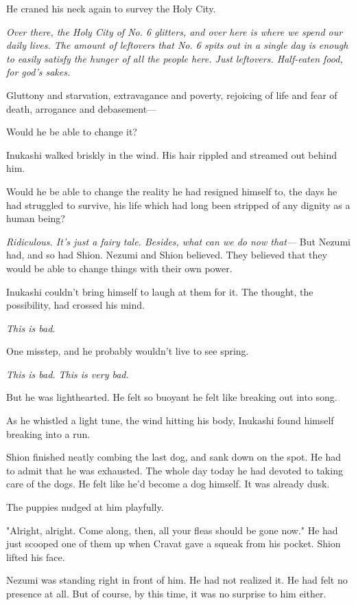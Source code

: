 He craned his neck again to survey the Holy City.

\emph{Over there, the Holy City of No. 6 glitters, and over here is where we
spend our daily lives. The amount of leftovers that No. 6 spits out in a
single day is enough to easily satisfy the hunger of all the people
here. Just leftovers. Half-eaten food, for god's sakes.}

Gluttony and starvation, extravagance and poverty, rejoicing of life and
fear of death, arrogance and debasement---

Would he be able to change it?

Inukashi walked briskly in the wind. His hair rippled and streamed out
behind him.

Would he be able to change the reality he had resigned himself to, the
days he had struggled to survive, his life which had long been stripped
of any dignity as a human being?

\emph{Ridiculous. It's just a fairy tale. Besides, what can we do now that---}
But Nezumi had, and so had Shion. Nezumi and Shion believed. They
believed that they would be able to change things with their own power.

Inukashi couldn't bring himself to laugh at them for it. The thought,
the possibility, had crossed his mind.

\emph{This is bad.}

One misstep, and he probably wouldn't live to see spring.

\emph{This is bad. This is very bad.}

But he was lighthearted. He felt so buoyant he felt like breaking out
into song.

As he whistled a light tune, the wind hitting his body, Inukashi found
himself breaking into a run.

\myspace

Shion finished neatly combing the last dog, and sank down on the spot.
He had to admit that he was exhausted. The whole day today he had
devoted to taking care of the dogs. He felt like he'd become a dog
himself. It was already dusk.

The puppies nudged at him playfully.

"Alright, alright. Come along, then, all your fleas should be gone now."
He had just scooped one of them up when Cravat gave a squeak from his
pocket. Shion lifted his face.

Nezumi was standing right in front of him. He had not realized it. He
had felt no presence at all. But of course, by this time, it was no
surprise to him either.

